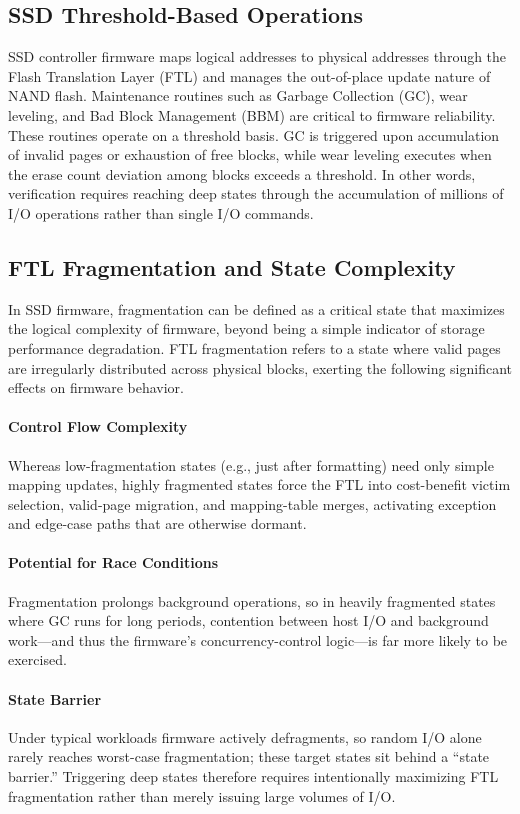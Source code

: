 \documentclass[conference]{IEEEtran}
\begin{document}
\subsection{SSD Threshold-Based Operations}
SSD controller firmware maps logical addresses to physical addresses through the Flash Translation Layer (FTL) and manages the out-of-place update nature of NAND flash.
Maintenance routines such as Garbage Collection (GC), wear leveling, and Bad Block Management (BBM) are critical to firmware reliability.
These routines operate on a threshold basis.
GC is triggered upon accumulation of invalid pages or exhaustion of free blocks, while wear leveling executes when the erase count deviation among blocks exceeds a threshold.
In other words, verification requires reaching deep states through the accumulation of millions of I/O operations rather than single I/O commands.

\subsection{FTL Fragmentation and State Complexity}
In SSD firmware, fragmentation can be defined as a critical state that maximizes the logical complexity of firmware, beyond being a simple indicator of storage performance degradation.
FTL fragmentation refers to a state where valid pages are irregularly distributed across physical blocks, exerting the following significant effects on firmware behavior.
 \paragraph{Control Flow Complexity} Whereas low-fragmentation states (e.g., just after formatting) need only simple mapping updates, highly fragmented states force the FTL into cost-benefit victim selection, valid-page migration, and mapping-table merges, activating exception and edge-case paths that are otherwise dormant.
\paragraph{Potential for Race Conditions} Fragmentation prolongs background operations, so in heavily fragmented states where GC runs for long periods, contention between host I/O and background work---and thus the firmware's concurrency-control logic---is far more likely to be exercised.
\paragraph{State Barrier} Under typical workloads firmware actively defragments, so random I/O alone rarely reaches worst-case fragmentation; these target states sit behind a ``state barrier.'' Triggering deep states therefore requires intentionally maximizing FTL fragmentation rather than merely issuing large volumes of I/O.
\end{document}
